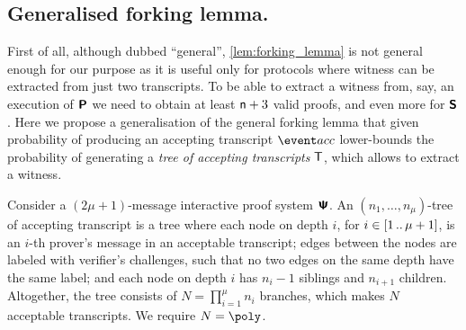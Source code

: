 \documentclass[runningheads,11pt]{llncs}
\begin{document}
\subsection{Generalised forking lemma.}
First of all, although dubbed ``general'', \cref{lem:forking_lemma} is not
general enough for our purpose as it is useful only for protocols where witness
can be extracted from just two transcripts. To be able to extract a witness
from, say, an execution of $\bm{\mathsf{P}}$ we need to obtain at least
$\mathsf{n} + 3$ valid proofs, and even more for $\bm{\mathsf{S}}$. Here we
propose a generalisation of the general forking lemma that given probability of
producing an accepting transcript $\accProb$ lower-bounds the probability of
generating a \emph{tree of accepting transcripts} $\mathsf{T}$, which allows to
extract a witness.

\begin{definition}
	\label{def:tree_of_accepting_transcripts}
	Consider a $(2\mu + 1)$-message interactive proof system $\bm{\mathsf{\Psi}}$. An $(n_1,
  \ldots, n_\mu)$-tree of accepting transcript is a tree where each node on
  depth $i$, for $i \in [1 \, .. \, \mu + 1]$, is an $i$-th prover's message in an
  acceptable transcript; edges between the nodes are labeled with verifier's
  challenges, such that no two edges on the same depth have the same
  label; and each node on depth $i$ has $n_{i} - 1$ siblings and $n_{i +
    1}$ children. Altogether, the tree consists of $N = \prod_{i = 1}^\mu n_i$
  branches, which makes $N$ acceptable transcripts. We require $N = \poly$.
\end{definition}
\end{document}
